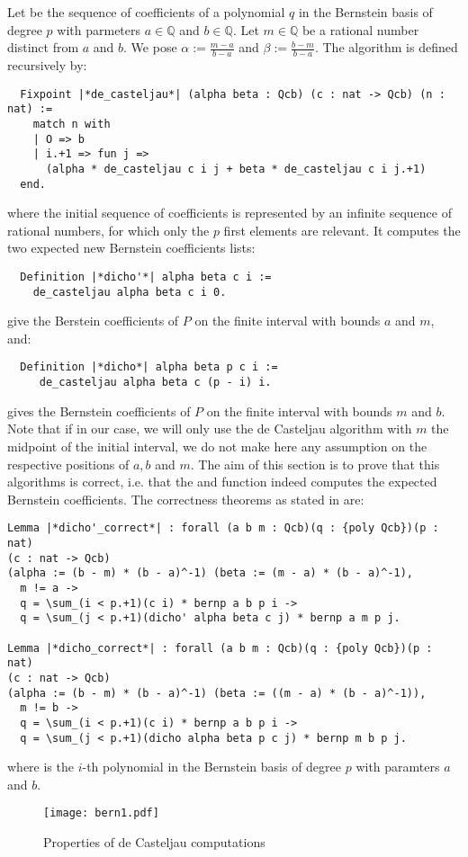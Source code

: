 \documentclass{mscs}
\begin{document}
Let  be the sequence of coefficients of a polynomial $q$
in the Bernstein basis of degree $p$ with parmeters $a\in \mathbb{Q}$
and $b\in \mathbb{Q}$. Let $m\in \mathbb{Q}$ be a rational number
distinct from $a$ and $b$. We pose
$\alpha := \frac{m - a}{b - a}$ and $\beta := \frac{b - m}{b -a}$. The
 algorithm is defined recursively by:
\begin{lstlisting}
  Fixpoint |*de_casteljau*| (alpha beta : Qcb) (c : nat -> Qcb) (n : nat) :=
    match n with
    | O => b
    | i.+1 => fun j =>
      (alpha * de_casteljau c i j + beta * de_casteljau c i j.+1)
  end.
\end{lstlisting}
where the initial sequence of coefficients  is represented by an
infinite sequence of rational numbers, for which only the $p$ first
elements are relevant.
It computes the two expected new Bernstein coefficients lists:
\begin{lstlisting}
  Definition |*dicho'*| alpha beta c i :=
    de_casteljau alpha beta c i 0.
\end{lstlisting}
give the Berstein coefficients of $P$ on the finite interval with
bounds $a$ and $m$, and:
\begin{lstlisting}
  Definition |*dicho*| alpha beta p c i :=
     de_casteljau alpha beta c (p - i) i.
\end{lstlisting}
gives the Bernstein coefficients of $P$ on the finite interval with
bounds $m$ and $b$. Note that if in our case, we will only use the de
Casteljau algorithm with $m$ the midpoint of the initial interval, we
do not make here any assumption on the respective positions of $a, b$
and $m$. The aim of this section is to prove that this algorithms is
correct, i.e. that the  and  function
indeed computes the expected Bernstein coefficients. The correctness
theorems as stated in \Coq{} are:
\begin{lstlisting}
Lemma |*dicho'_correct*| : forall (a b m : Qcb)(q : {poly Qcb})(p : nat)
(c : nat -> Qcb)
(alpha := (b - m) * (b - a)^-1) (beta := (m - a) * (b - a)^-1),
  m != a ->
  q = \sum_(i < p.+1)(c i) * bernp a b p i ->
  q = \sum_(j < p.+1)(dicho' alpha beta c j) * bernp a m p j.

Lemma |*dicho_correct*| : forall (a b m : Qcb)(q : {poly Qcb})(p : nat)
(c : nat -> Qcb)
(alpha := (b - m) * (b - a)^-1) (beta := ((m - a) * (b - a)^-1)),
  m != b ->
  q = \sum_(i < p.+1)(c i) * bernp a b p i ->
  q = \sum_(j < p.+1)(dicho alpha beta p c j) * bernp m b p j.
\end{lstlisting}
where  is the $i$-th polynomial in the Bernstein
basis of degree $p$ with paramters $a$ and $b$.
\begin{figure}[ht]\label{bern}
\begin{center}
\texttt{[image: bern1.pdf]}
\end{center}
\caption{Properties of de Casteljau computations}
\end{figure}
\end{document}
